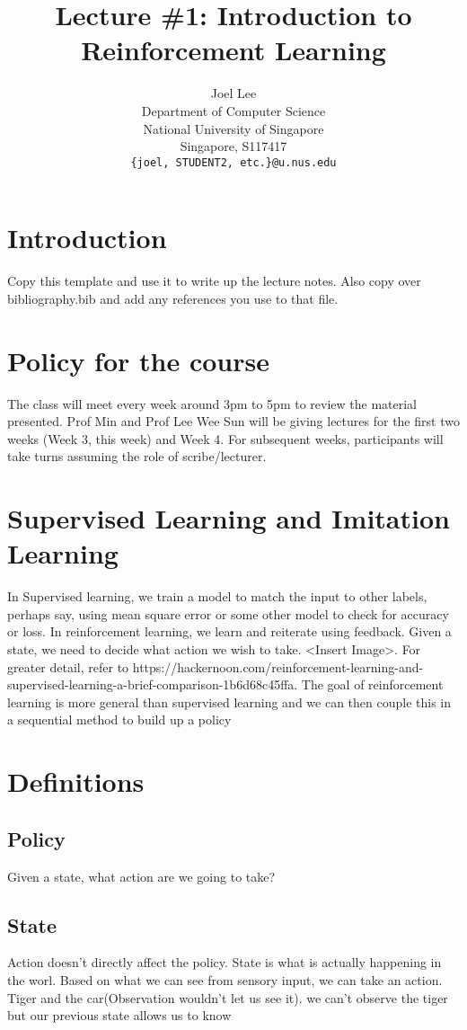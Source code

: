 \documentclass{article}
\title{Lecture \#1: Introduction to Reinforcement Learning}
\author{
  Joel Lee\\
  Department of Computer Science\\
  National University of Singapore\\
  Singapore, S117417 \\
  \texttt{\{joel, STUDENT2, etc.\}@u.nus.edu} \\
}
\begin{document}
\maketitle

\section{Introduction}
Copy this template and use it to write up the lecture notes. Also copy over
bibliography.bib and add any references you use to that file.

\section{Policy for the course}
The class will meet every week around 3pm to 5pm to review the
material presented. Prof Min and Prof Lee Wee Sun will be giving
lectures for the first two weeks (Week 3, this week) and Week 4. For
subsequent weeks, participants will take turns assuming the role of
scribe/lecturer.

\section{Supervised Learning and Imitation Learning}

In Supervised learning, we train a model to match the input to other
labels, perhaps say, using mean square error or some other model to
check for accuracy or loss. In reinforcement learning, we learn and
reiterate using feedback. Given a state, we need to decide what action
we wish to take. <Insert Image>. For greater detail, refer to
https://hackernoon.com/reinforcement-learning-and-supervised-learning-a-brief-comparison-1b6d68c45ffa. The
goal of reinforcement learning is more general than supervised
learning and we can then couple this in a sequential method to build
up a policy

\section{Definitions}

\subsection{Policy}
Given a state, what action are we going to take?

\subsection{State}
Action doesn't directly affect the policy. State is what is actually
happening in the worl.  Based on what we can see from sensory input,
we can take an action.  Tiger and the car(Observation wouldn't let us
see it). we can't observe the tiger but our previous state allows us
to know
\end{document}
